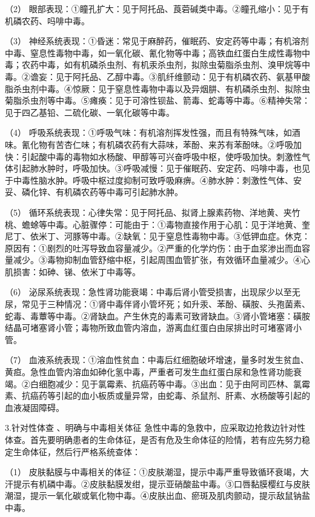 （2）
眼部表现：①瞳孔扩大：见于阿托品、莨菪碱类中毒。②瞳孔缩小：见于有机磷农药、吗啡中毒。

（3）
神经系统表现：①昏迷：常见于麻醉药，催眠药、安定药等中毒；有机溶剂中毒、窒息性毒物中毒，如一氧化碳、氰化物等中毒；高铁血红蛋白生成性毒物中毒；农药中毒，如有机磷杀虫剂、有机汞杀虫剂，拟除虫菊脂杀虫剂、溴甲烷等中毒。②谵妄：见于阿托品、乙醇中毒。③肌纤维颤动：见于有机磷农药、氨基甲酸脂杀虫剂中毒。④惊厥：见于窒息性毒物中毒以及异烟肼、有机磷杀虫剂、拟除虫菊脂杀虫剂等中毒。⑤瘫痪：见于可溶性钡盐、箭毒、蛇毒等中毒。⑥精神失常：见于四乙基铅、二硫化碳、一氧化碳等中毒。

（4）
呼吸系统表现：①呼吸气味：有机溶剂挥发性强，而且有特殊气味，如酒味。氰化物有苦杏仁味；有机磷农药有大蒜味，苯酚、来苏有苯酚味。②呼吸加快：引起酸中毒的毒物如水杨酸、甲醇等可兴奋呼吸中枢，使呼吸加快。刺激性气体引起肺水肿时，呼吸加快。③呼吸减慢：见于催眠药、安定药、吗啡中毒，也见于中毒性脑水肿。呼吸中枢过度抑制可致呼吸麻痹。④肺水肿：刺激性气体、安妥、磷化锌、有机磷农药等中毒可引起肺水肿。

（5）
循环系统表现：心律失常：见于阿托品、拟肾上腺素药物、洋地黄、夹竹桃、蟾蜍等中毒。心脏骤停：可能由于：①毒物直接作用于心肌：见于洋地黄、奎尼丁、依米丁、河豚等中毒。②缺氧：见于窒息性毒物中毒。③低钾血症。休克：原因有：①剧烈的吐泻导致血容量减少。②严重的化学灼伤：由于血浆渗出而血容量减少。③毒物抑制血管舒缩中枢，引起周围血管扩张，有效循环血量减少。④心肌损害：如砷、锑、依米丁中毒等。

（6）
泌尿系统表现：急性肾功能衰竭：中毒后肾小管受损害，出现尿少以至无尿，常见于三种情况：①肾中毒伴肾小管坏死；如升汞、苯酚、磺胺、头孢菌素、蛇毒、毒蕈等中毒。②肾缺血。产生休克的毒素可致肾缺血。③肾小管堵塞：磺胺结晶可堵塞肾小管；毒物所致血管内溶血，游离血红蛋白由尿排出时可堵塞肾小管。

（7）
血液系统表现：①溶血性贫血：中毒后红细胞破坏增速，量多时发生贫血、黄疸。急性血管内溶血如砷化氢中毒，严重者可发生血红蛋白尿和急性肾功能衰竭。②白细胞减少：见于氯霉素、抗癌药等中毒。③出血：见于由阿司匹林、氯霉素、抗癌药等引起的血小板质或量异常，由蛇毒、杀鼠剂、肝素、水杨酸等引起的血液凝固障碍。

3.针对性体查 、明确与中毒相关体征
急性中毒的急救中，应采取边抢救边针对性体查。首先要明确患者的生命体征，是否有危及生命体征的险情，若有应先努力稳定生命体征，然后行严格系统查体：

（1）
皮肤黏膜与中毒相关的体征：①皮肤潮湿，提示中毒严重导致循环衰竭，大汗提示有机磷中毒。②皮肤黏膜发绀，提示亚硝酸盐中毒。③口唇黏膜樱红与皮肤潮湿，提示一氧化碳或氧化物中毒。④皮肤出血、瘀斑及肌肉颤动，提示敌鼠钠盐中毒。

